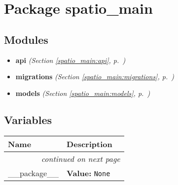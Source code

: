 %
%
%


\section{Package spatio\_main}

    \label{spatio_main}


\subsection{Modules}

\begin{itemize}
\setlength{\parskip}{0ex}
\item \textbf{api}
  \textit{(Section \ref{spatio_main:api}, p.~\pageref{spatio_main:api})}

\item \textbf{migrations}
  \textit{(Section \ref{spatio_main:migrations}, p.~\pageref{spatio_main:migrations})}

\item \textbf{models}
  \textit{(Section \ref{spatio_main:models}, p.~\pageref{spatio_main:models})}

\end{itemize}



  \subsection{Variables}

    \vspace{-1cm}
\hspace{\varindent}\begin{longtable}{|p{\varnamewidth}|p{\vardescrwidth}|l}
\cline{1-2}
\cline{1-2} \centering \textbf{Name} & \centering \textbf{Description}& \\
\cline{1-2}
\endhead\cline{1-2}\multicolumn{3}{r}{\small\textit{continued on next page}}\\\endfoot\cline{1-2}
\endlastfoot\raggedright \_\-\_\-p\-a\-c\-k\-a\-g\-e\-\_\-\_\- & \raggedright \textbf{Value:} 
{\tt None}&\\
\cline{1-2}
\end{longtable}

